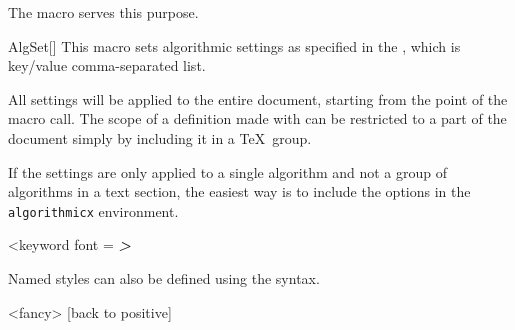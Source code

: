 \documentclass[a4paper, 11pt]{article}
\begin{document}
The  macro serves this purpose.

\begin{macro}{AlgSet}[]
    This macro sets algorithmic settings as specified in the , which is key/value comma-separated list.

    All settings will be applied to the entire document, starting from the point of the macro call. The scope of a definition made with  can be restricted to a part of the document simply by including it in a \TeX\ group.
\end{macro}

\begingroup
\begin{tcblisting}{}
    \begin{algorithmic}
        \EndIf
    \end{algorithmic}
\end{tcblisting}
\endgroup%

If the settings are only applied to a single algorithm and not a group of algorithms in a text section, the easiest way is to include the options in the \texttt{algorithmicx} environment.

\begin{tcblisting}{}
    \begin{algorithmic}<keyword font = \sffamily\bfseries\itshape>
        \EndIf
    \end{algorithmic}
\end{tcblisting}

Named styles can also be defined using the  syntax.

\begin{tcblisting}{}
    \begin{algorithmic}<fancy>
            [back to positive]
        \EndIf
    \end{algorithmic}
\end{tcblisting}
\end{document}
